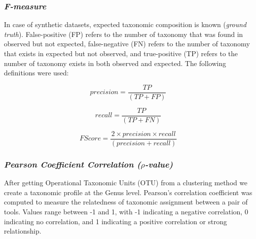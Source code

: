 \documentclass[10pt, conference, compsocconf]{IEEEtran}
\begin{document}
\subsubsection{\textit{F-measure}}
In case of synthetic datasets, expected taxonomic composition is known (\emph{ground truth}). False-positive (FP) refers to the number of taxonomy that was found in observed but not expected, false-negative (FN) refers to the number of taxonomy that exists in expected but not observed, and true-positive (TP) refers to the number of taxonomy exists in both observed and expected. The following definitions were used:

\begin{equation}
precision = \frac{TP}{(TP + FP)}
\end{equation}

\begin{equation}
recall = \frac{TP}{(TP + FN)}
\end{equation}

\begin{equation}
F Score = \frac{2 \times precision \times recall}{(precision + recall)}
\end{equation}

\subsubsection{\textit{Pearson Coefficient Correlation ($\rho$-value)}}
After getting Operational Taxonomic Units (OTU) from a clustering method we create a taxonomic profile at the Genus level. Pearson’s correlation coefficient was computed to measure the relatedness of taxonomic assignment between a pair of tools. Values range between -1 and 1, with -1 indicating a negative correlation, 0 indicating no correlation, and 1 indicating a positive correlation or strong relationship.
\end{document}
